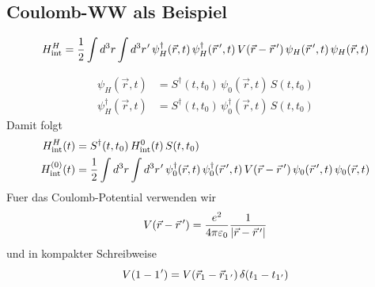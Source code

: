 \subsection{Coulomb-WW als Beispiel}
\begin{equation}
  H_{\mathrm{int}}^{H}=\frac{1}{2}\int d^{3}r\int d^{3}r\mkern1mu'\,\psi_{H}^{\dagger}(\vec r,t)\,\psi_{H}^{\dagger}(\vec r\mkern3mu',t)\,V(\vec r-\vec r\mkern3mu')\,\psi_{H}(\vec r\mkern3mu',t)\,\psi_{H}(\vec r,t)
\end{equation}

\begin{equation}
  \begin{aligned}
    \psi_{H}(\vec r,t)           & =S^{\dagger}(t,t_{0})\,\psi_{0}(\vec r,t)\,S(t,t_{0})           \\
    \psi_{H}^{\dagger}(\vec r,t) & =S^{\dagger}(t,t_{0})\,\psi_{0}^{\dagger}(\vec r,t)\,S(t,t_{0})
  \end{aligned}
\end{equation}
Damit folgt
\begin{equation}
  \begin{aligned}
    H_{\mathrm{int}}^{H}(t)   & =S^{\dagger}(t,t_{0})\,H_{\mathrm{int}}^{0}(t)\,S(t,t_{0})                                                                                                                                       \\
    H_{\mathrm{int}}^{(0)}(t) & =\frac{1}{2}\int d^{3}r\int d^{3}r\mkern1mu'\,\psi_{0}^{\dagger}(\vec r,t)\,\psi_{0}^{\dagger}(\vec r\mkern3mu',t)\,V(\vec r-\vec r\mkern3mu')\,\psi_{0}(\vec r\mkern3mu',t)\,\psi_{0}(\vec r,t)
  \end{aligned}
\end{equation}
Fuer das Coulomb-Potential verwenden wir
\begin{equation}
  V(\vec r-\vec r\mkern3mu')=\frac{e^{2}}{4\pi\varepsilon_{0}}\frac{1}{\lvert\vec r-\vec r\mkern3mu'\rvert}
\end{equation}
und in kompakter Schreibweise
\begin{equation}
  V(1-1\mkern1mu')=V(\vec r_{1}-\vec r_{1\mkern3mu'})\,\delta(t_{1}-t_{1\mkern1mu'})
\end{equation}

